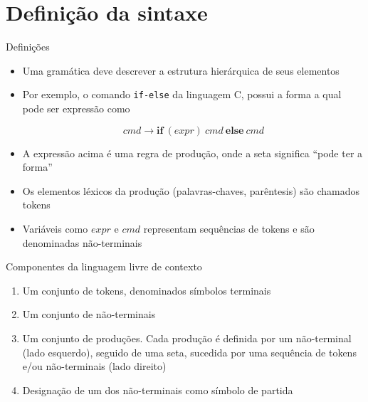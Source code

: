 \section{Definição da sintaxe}

\begin{frame}[fragile]{Definições}

    \begin{itemize}
        \item Uma gramática deve descrever a estrutura hierárquica de seus elementos
        \pause

        \item Por exemplo, o comando \texttt{if-else} da linguagem C, possui a forma
        a qual pode ser expressão como
        \begin{footnotesize}
        \[
            cmd \to \mathbf{if}\ (expr)\ cmd\ \mathbf{else}\ cmd
        \] 
        \end{footnotesize} \pause
        \item A expressão acima é uma regra de produção, onde a seta significa ``pode ter a forma''
        \pause

        \item Os elementos léxicos da produção (palavras-chaves, parêntesis) são chamados tokens
        \pause

        \item Variáveis como $expr$ e  $cmd$ representam sequências de tokens e são denominadas não-terminais
    \end{itemize}

\end{frame}

\begin{frame}[fragile]{Componentes da linguagem livre de contexto}

    \begin{enumerate}
        \item Um conjunto de tokens, denominados símbolos terminais
        \pause

        \item Um conjunto de não-terminais
        \pause

        \item Um conjunto de produções. Cada produção é definida por um não-terminal (lado esquerdo), seguido de uma seta, sucedida por uma sequência de tokens
            e/ou não-terminais (lado direito)
        \pause

        \item Designação de um dos não-terminais como símbolo de partida
    \end{enumerate}

\end{frame}

